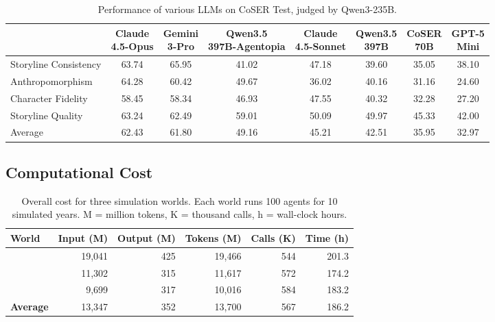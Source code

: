 \begin{table}[t]
\caption{%
Performance of various LLMs on CoSER Test, judged by Qwen3-235B.
}
\label{tab:coser_results}
\centering
\small
\setlength{\tabcolsep}{3pt}
\begin{tabular}{l ccccccc}
\toprule
& \makecell{Claude\\4.5-Opus} & \makecell{Gemini\\3-Pro} & \makecell{Qwen3.5\\397B-Agentopia} & \makecell{Claude\\4.5-Sonnet} & \makecell{Qwen3.5\\397B} & \makecell{CoSER\\70B} & \makecell{GPT-5\\Mini} \\
\midrule
Storyline Consistency & 63.74 & 65.95 & 41.02 & 47.18 & 39.60 & 35.05 & 38.10 \\
Anthropomorphism      & 64.28 & 60.42 & 49.67 & 36.02 & 40.16 & 31.16 & 24.60 \\
Character Fidelity    & 58.45 & 58.34 & 46.93 & 47.55 & 40.32 & 32.28 & 27.20 \\
Storyline Quality     & 63.24 & 62.49 & 59.01 & 50.09 & 49.97 & 45.33 & 42.00 \\
\midrule
Average               & 62.43 & 61.80 & 49.16 & 45.21 & 42.51 & 35.95 & 32.97 \\
\bottomrule
\end{tabular}
\end{table}

\subsection{Computational Cost}
\label{sec:cost}


\begin{table}[t]
\centering
\caption{Overall cost for three simulation worlds.
Each world runs 100 agents for 10 simulated years.
M = million tokens, K = thousand calls, h = wall-clock hours.}
\label{tab:cost_overall}
\small
\begin{tabular}{l rrrrr}
\toprule
\textbf{World} & Input (M) & Output (M) & Tokens (M) & Calls (K) & Time (h) \\
\midrule
\campus{}       & 19,041 & 425 & 19,466 & 544 & 201.3 \\
\academy{}      & 11,302 & 315 & 11,617 & 572 & 174.2 \\
\apartment{}    &  9,699 & 317 & 10,016 & 584 & 183.2 \\
\midrule
\textbf{Average} & 13,347 & 352 & 13,700 & 567 & 186.2 \\
\bottomrule
\end{tabular}
\end{table}

